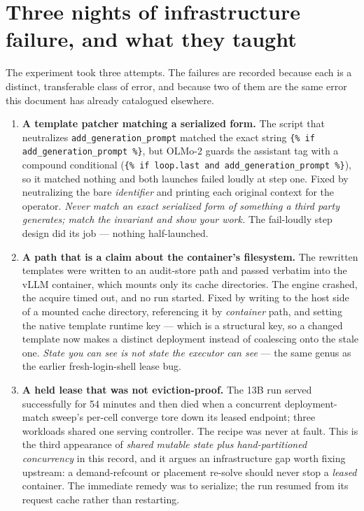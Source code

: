 \documentclass[11pt]{report}
\newcommand{\code}[1]{\texttt{#1}}
\begin{document}
\section{Three nights of infrastructure failure, and what they taught}
\label{sec:contention}

The experiment took three attempts. The failures are recorded because each is a
distinct, transferable class of error, and because two of them are the same error
this document has already catalogued elsewhere.

\begin{enumerate}
  \item \textbf{A template patcher matching a serialized form.} The script that
        neutralizes \code{add\_generation\_prompt} matched the exact string
        \code{\{\% if add\_generation\_prompt \%\}}, but OLMo-2 guards the assistant
        tag with a compound conditional (\code{\{\% if loop.last and
        add\_generation\_prompt \%\}}), so it matched nothing and both launches
        failed loudly at step one. Fixed by neutralizing the bare
        \emph{identifier} and printing each original context for the operator.
        \emph{Never match an exact serialized form of something a third party
        generates; match the invariant and show your work.} The fail-loudly step
        design did its job --- nothing half-launched.
  \item \textbf{A path that is a claim about the container's filesystem.} The
        rewritten templates were written to an audit-store path and passed verbatim
        into the vLLM container, which mounts only its cache directories. The
        engine crashed, the acquire timed out, and no run started. Fixed by writing
        to the host side of a mounted cache directory, referencing it by
        \emph{container} path, and setting the native template runtime key --- which
        is a structural key, so a changed template now makes a distinct deployment
        instead of coalescing onto the stale one. \emph{State you can see is not
        state the executor can see} --- the same genus as the earlier
        fresh-login-shell lease bug.
  \item \textbf{A held lease that was not eviction-proof.} The 13B run served
        successfully for 54 minutes and then died when a concurrent
        deployment-match sweep's per-cell converge tore down its leased endpoint;
        three workloads shared one serving controller. The recipe was never at
        fault. This is the third appearance of \emph{shared mutable state plus
        hand-partitioned concurrency} in this record, and it argues an
        infrastructure gap worth fixing upstream: a demand-refcount or placement
        re-solve should never stop a \emph{leased} container. The immediate remedy
        was to serialize; the run resumed from its request cache rather than
        restarting.
\end{enumerate}
\end{document}
